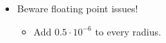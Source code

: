 \begin{frame}
\begin{columns}
\begin{column}{0.7\textwidth}
\begin{itemize}
    	\item<+-> Beware floating point issues!
    	\begin{itemize}
    		\item<+-> Add $0.5 \cdot 10^{-6}$ to every radius.
    	\end{itemize}
    \end{itemize}
    \end{column}
    \begin{column}{0.3\textwidth}
      \begin{center}
      \end{center}
    \end{column}
    \end{columns}
    \solvestats
\end{frame}
